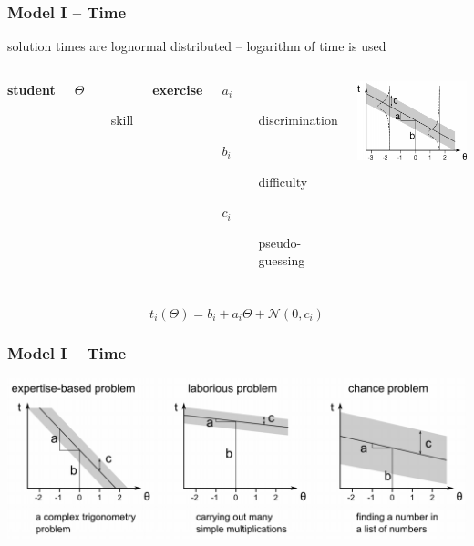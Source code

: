 \documentclass[xcolor=svgnames]{beamer}
\begin{document}
\begin{frame}
	\frametitle{Model I -- Time}

	\bigskip
	solution times are lognormal distributed -- logarithm of time is used

	\bigskip
	\begin{columns}
		\textbf{student}
		\begin{description}
			\item[$\Theta$]	skill
		\end{description}
		\textbf{exercise}
		\begin{description}
			\item[$a_i$] discrimination
			\item[$b_i$] difficulty
			\item[$c_i$] pseudo-guessing
		\end{description}
		\includegraphics[width=\textwidth]{2013-VV041-student-modeling/time-model.png}
	\end{columns}
	\begin{center}
		$$
		t_i(\Theta) = b_i + a_i\Theta + \mathcal{N}(0, c_i)
		$$
	\end{center}
\end{frame}
\begin{frame}
	\frametitle{Model I -- Time}

	\begin{center}
		\includegraphics[width=.95\textwidth]{2013-VV041-student-modeling/time-model-types.png}
	\end{center}
\end{frame}
\end{document}
